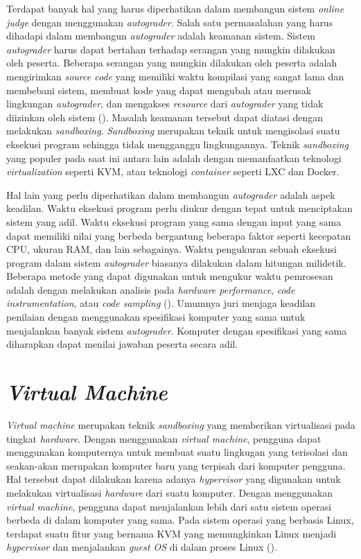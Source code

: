 \par Terdapat banyak hal yang harus diperhatikan dalam membangun sistem \textit{online judge} dengan menggunakan \textit{autograder}. Salah satu permasalahan yang harus dihadapi dalam membangun \textit{autograder} adalah keamanan sistem. Sistem \textit{autograder} harus dapat bertahan terhadap serangan yang mungkin dilakukan oleh peserta. Beberapa serangan yang mungkin dilakukan oleh peserta adalah mengirimkan \textit{source code} yang memiliki waktu kompilasi yang sangat lama dan membebani sistem, membuat kode yang dapat mengubah atau merusak lingkungan \textit{autograder}, dan mengakses \textit{resource} dari \textit{autograder} yang tidak diizinkan oleh sistem (\cite{wasikojsurvey}). Masalah keamanan tersebut dapat diatasi dengan melakukan \textit{sandboxing}. \textit{Sandboxing} merupakan teknik untuk mengisolasi suatu eksekusi program sehingga tidak mengganggu lingkungannya. Teknik \textit{sandboxing} yang populer pada saat ini antara lain adalah dengan memanfaatkan teknologi \textit{virtualization} seperti KVM, atau teknologi \textit{container} seperti LXC dan Docker.

\par Hal lain yang perlu diperhatikan dalam membangun \textit{autograder} adalah aspek keadilan. Waktu eksekusi program perlu diukur dengan tepat untuk menciptakan sistem yang adil. Waktu eksekusi program yang sama dengan input yang sama dapat memiliki nilai yang berbeda bergantung beberapa faktor seperti kecepatan CPU, ukuran RAM, dan lain sebagainya. Waktu pengukuran sebuah eksekusi program dalam sistem \textit{autograder} biasanya dilakukan dalam hitungan milidetik. Beberapa metode yang dapat digunakan untuk mengukur waktu pemrosesan adalah dengan melakukan analisis pada \textit{hardware performance}, \textit{code instrumentation}, atau \textit{code sampling} (\cite{wasikojsurvey}). Umumnya juri menjaga keadilan penilaian dengan menggunakan spesifikasi komputer yang sama untuk menjalankan banyak sistem \textit{autograder}. Komputer dengan spesifikasi yang sama diharapkan dapat menilai jawaban peserta secara adil.

\section{\textit{Virtual Machine}}

\par \textit{Virtual machine} merupakan teknik \textit{sandboxing} yang memberikan virtualisasi pada tingkat \textit{hardware}. Dengan menggunakan \textit{virtual machine}, pengguna dapat menggunakan komputernya untuk membuat suatu lingkugan yang terisolasi dan seakan-akan merupakan komputer baru yang terpisah dari komputer pengguna. Hal tersebut dapat dilakukan karena adanya \textit{hypervisor} yang digunakan untuk melakukan virtualisasi \textit{hardware} dari suatu komputer. Dengan menggunakan \textit{virtual machine}, pengguna dapat menjalankan lebih dari satu sistem operasi berbeda di dalam komputer yang sama. Pada sistem operasi yang berbasis Linux, terdapat suatu fitur yang bernama KVM yang memungkinkan Linux menjadi \textit{hypervisor} dan menjalankan \textit{guest OS} di dalam proses Linux (\cite{wfeltervmcontainer}).

